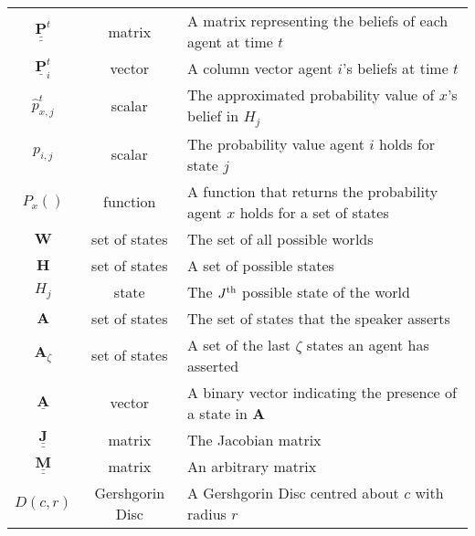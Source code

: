 \begin{table}[H]
\begin{tabular}{|c|c|l|}
$\underline{\underline{\mathbf{P}}}^t$ & matrix & A matrix representing the beliefs of each agent at time $t$ \\
$\underline{\mathbf{P}}^t_i$ & vector & A column vector agent $i$'s beliefs at time $t$\\
$\hat{p}^t_{x,j}$ & scalar & The approximated probability value of $x$'s belief in $H_j$ \\
$p_{i,j}$ & scalar & The probability value agent $i$ holds for state $j$\\
$P_x()$ & function & A function that returns the probability agent $x$ holds for a set of states\\ \hline \hline

$\mathbf{W}$ & set of states & The set of all possible worlds \\
$\mathbf{H}$ & set of states & A set of possible states \\
$H_j$ & state & The $J^\textnormal{th}$ possible state of the world \\
$\mathbf{A}$ & set of states & The set of states that the speaker asserts \\
$\mathbf{A}_\zeta$ & set of states & A set of the last $\zeta$ states an agent has asserted \\
$\underline{\mathbf{A}}$ & vector & A binary vector indicating the presence of a state in $\mathbf{A}$ \\ \hline \hline 


$\underline{\underline{\mathbf{J}}}$ & matrix & The Jacobian matrix \\
$\underline{\underline{\mathbf{M}}}$ & matrix & An arbitrary matrix\\ \hline \hline  

$D(c, r)$ & Gershgorin Disc & A Gershgorin Disc centred about $c$ with radius $r$ \\ \hline \hline



\end{tabular}
\end{table}

